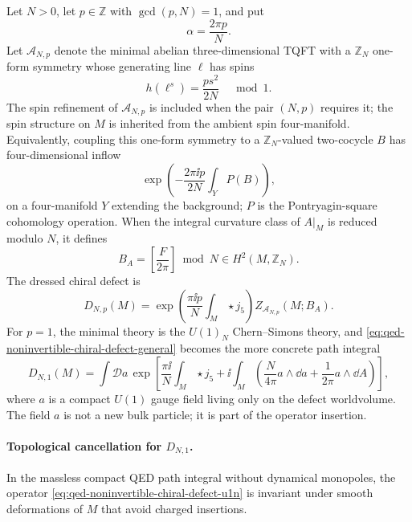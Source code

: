 Let \(N>0\), let \(p\in\mathbb Z\) with \(\gcd(p,N)=1\), and put
\[
  \alpha=\frac{2\pi p}{N}.
\]
Let \(\mathcal A_{N,p}\) denote the minimal abelian three-dimensional TQFT with
a \(\mathbb Z_N\) one-form symmetry whose generating line \(\ell\) has spins
\[
  h(\ell^s)=\frac{p s^2}{2N}\quad \bmod 1 .
\]
The spin refinement of \(\mathcal A_{N,p}\) is included when the pair
\((N,p)\) requires it; the spin structure on \(M\) is inherited from the
ambient spin four-manifold.  Equivalently, coupling this one-form symmetry to
a \(\mathbb Z_N\)-valued two-cocycle \(B\) has four-dimensional inflow
\[
  \exp\left(
  -\frac{2\pi\ii p}{2N}\int_Y P(B)
  \right),
\]
on a four-manifold \(Y\) extending the background; \(P\) is the
Pontryagin-square cohomology operation.  When the integral curvature class of
\(A|_M\) is reduced modulo \(N\), it defines
\[
  B_A=\left[\frac{F}{2\pi}\right]\bmod N
  \in H^2(M,\mathbb Z_N).
\]
The dressed chiral defect is
\begin{equation}
  D_{N,p}(M)
  =
  \exp\left(\frac{\pi\ii p}{N}\int_M\star j_5\right)
  Z_{\mathcal A_{N,p}}(M;B_A).
  \label{eq:qed-noninvertible-chiral-defect-general}
\end{equation}
For \(p=1\), the minimal theory is the \(U(1)_N\) Chern--Simons theory, and
\eqref{eq:qed-noninvertible-chiral-defect-general} becomes the more concrete
path integral
\begin{equation}
  D_{N,1}(M)
  =
  \int\mathcal D a\,
  \exp\left[
  \frac{\pi\ii}{N}\int_M\star j_5
  +
  \ii\int_M
  \left(
    \frac{N}{4\pi}a\wedge\dd a
    +\frac{1}{2\pi}a\wedge\dd A
  \right)
  \right],
  \label{eq:qed-noninvertible-chiral-defect-u1n}
\end{equation}
where \(a\) is a compact \(U(1)\) gauge field living only on the defect
worldvolume.  The field \(a\) is not a new bulk particle; it is part of the
operator insertion.

\paragraph{Topological cancellation for \(D_{N,1}\).}
In the massless compact QED path integral without dynamical monopoles, the
operator \eqref{eq:qed-noninvertible-chiral-defect-u1n} is invariant under
smooth deformations of \(M\) that avoid charged insertions.

